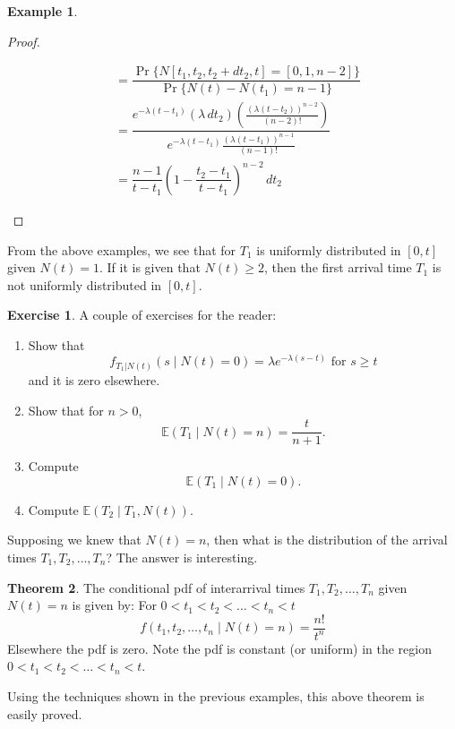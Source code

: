 \documentclass[letterpaper, 12pt]{article}
\newcommand{\1}{\mathds{1}} %
\theoremstyle{definition}
\newtheorem{theorem}{Theorem}[section]
\newtheorem{example}[theorem]{Example}
\newtheorem{exercise}{Exercise}
\begin{document}
\begin{example}
\begin{proof}
\begin{enumerate}
\begin{align*}
                                      &= \dfrac{\Pr\{N[t_1,t_2,t_2+dt_2,t]=[0,1,n-2]\}}{\Pr\{N(t)- N(t_1)=n-1\}}\\
                                      &= \dfrac{e^{-\lambda (t-t_1)}(\lambda \, dt_2) \left(\frac{(\lambda (t-t_2))^{n-2}}{(n-2)!}\right)}{e^{-\lambda (t-t_1)}\frac{(\lambda(t-t_1))^{n-1}}{(n-1)!}}\\
                                      &= \dfrac{n-1}{t-t_1} \left( 1 - \dfrac{t_2-t_1}{t-t_1}\right)^{n-2} \, dt_2
\end{align*}
\end{enumerate}
\end{proof} 
\end{example}

From the above examples, we see that for $T_1$ is uniformly distributed in $[0,t]$ given $N(t)=1$. If it is given that $N(t) \geq 2$, then the first arrival time $T_1$ is not uniformly distributed in $[0,t]$.


\begin{exercise}A couple of exercises for the reader:
\begin{enumerate}
    \item Show that $$f_{T_1|N(t)}(s \mid N(t)=0) = \lambda e^{-\lambda(s-t)} \,\, \text{for }s \geq t$$ and it is zero elsewhere. 
    \item Show that for $n > 0$, \[\mathbb{E}(T_1 \mid N(t)=n) = \dfrac{t}{n+1}.\]
    \item Compute \[\mathbb{E}(T_1 \mid N(t)=0).\]
    \item Compute $\mathbb{E}(T_2 \mid T_1,N(t))$.
\end{enumerate}
\end{exercise}

Supposing we knew that $N(t)=n$, then what is the distribution of the arrival times $T_1,T_2,\ldots,T_n$? The answer is interesting. 
\begin{theorem}
The conditional pdf of interarrival times $T_1,T_2,\ldots,T_n$ given $N(t)=n$ is given by: For $0<t_1<t_2<\ldots< t_n < t$
\[f(t_1,t_2,\ldots,t_n\mid N(t)=n) = \dfrac{n!}{t^n}\]
Elsewhere the pdf is zero. Note the pdf is constant (or uniform) in the region $0<t_1<t_2<\ldots< t_n < t$.
\end{theorem}
Using the techniques shown in the previous examples, this above theorem is easily proved.
\end{document}
